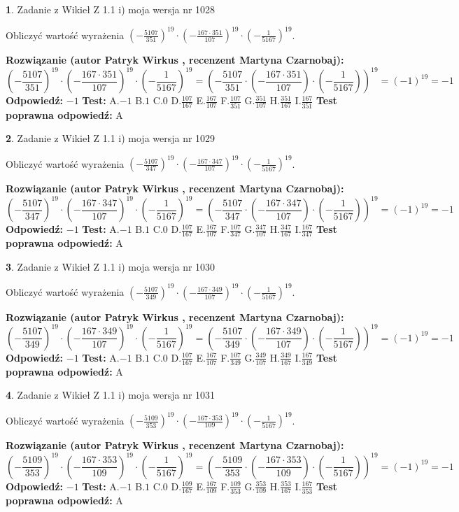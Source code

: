 \documentclass[12pt, a4paper]{article}
\theoremstyle{definition} %
\newtheorem{zad}{}
\newcommand{\zadStart}[1]{\begin{zad}#1\newline}
\newcommand{\zadStop}{\end{zad}}
\newcommand{\rozwStart}[2]{\noindent \textbf{Rozwiązanie (autor #1 , recenzent #2): }\newline}
\newcommand{\rozwStop}{\newline}
\newcommand{\odpStart}{\noindent \textbf{Odpowiedź:}\newline}
\newcommand{\odpStop}{\newline}
\newcommand{\testStart}{\noindent \textbf{Test:}\newline}
\newcommand{\testStop}{\newline}
\newcommand{\kluczStart}{\noindent \textbf{Test poprawna odpowiedź:}\newline}
\newcommand{\kluczStop}{\newline}
\begin{document}
\zadStart{Zadanie z Wikieł Z 1.1 i) moja wersja nr 1028}

Obliczyć wartość wyrażenia $(-\frac{5107}{351})^{19} \cdot (-\frac{167 \cdot 351}{107})^{19} \cdot (-\frac{1}{5167})^{19}$.
\zadStop
\rozwStart{Patryk Wirkus}{Martyna Czarnobaj}
$$(-\frac{5107}{351})^{19} \cdot (-\frac{167 \cdot 351}{107})^{19} \cdot (-\frac{1}{5167})^{19} = (-\frac{5107}{351} \cdot (-\frac{167 \cdot 351}{107}) \cdot (-\frac{1}{5167}))^{19} = (-1)^{19} = -1$$
\rozwStop
\odpStart
$-1$
\odpStop
\testStart
A.$-1$ B.$1$ C.$0$ D.$\frac{107}{167}$ E.$\frac{167}{107}$
F.$\frac{107}{351}$ G.$\frac{351}{107}$
H.$\frac{351}{167}$
I.$\frac{167}{351}$
\testStop
\kluczStart
A
\kluczStop



\zadStart{Zadanie z Wikieł Z 1.1 i) moja wersja nr 1029}

Obliczyć wartość wyrażenia $(-\frac{5107}{347})^{19} \cdot (-\frac{167 \cdot 347}{107})^{19} \cdot (-\frac{1}{5167})^{19}$.
\zadStop
\rozwStart{Patryk Wirkus}{Martyna Czarnobaj}
$$(-\frac{5107}{347})^{19} \cdot (-\frac{167 \cdot 347}{107})^{19} \cdot (-\frac{1}{5167})^{19} = (-\frac{5107}{347} \cdot (-\frac{167 \cdot 347}{107}) \cdot (-\frac{1}{5167}))^{19} = (-1)^{19} = -1$$
\rozwStop
\odpStart
$-1$
\odpStop
\testStart
A.$-1$ B.$1$ C.$0$ D.$\frac{107}{167}$ E.$\frac{167}{107}$
F.$\frac{107}{347}$ G.$\frac{347}{107}$
H.$\frac{347}{167}$
I.$\frac{167}{347}$
\testStop
\kluczStart
A
\kluczStop



\zadStart{Zadanie z Wikieł Z 1.1 i) moja wersja nr 1030}

Obliczyć wartość wyrażenia $(-\frac{5107}{349})^{19} \cdot (-\frac{167 \cdot 349}{107})^{19} \cdot (-\frac{1}{5167})^{19}$.
\zadStop
\rozwStart{Patryk Wirkus}{Martyna Czarnobaj}
$$(-\frac{5107}{349})^{19} \cdot (-\frac{167 \cdot 349}{107})^{19} \cdot (-\frac{1}{5167})^{19} = (-\frac{5107}{349} \cdot (-\frac{167 \cdot 349}{107}) \cdot (-\frac{1}{5167}))^{19} = (-1)^{19} = -1$$
\rozwStop
\odpStart
$-1$
\odpStop
\testStart
A.$-1$ B.$1$ C.$0$ D.$\frac{107}{167}$ E.$\frac{167}{107}$
F.$\frac{107}{349}$ G.$\frac{349}{107}$
H.$\frac{349}{167}$
I.$\frac{167}{349}$
\testStop
\kluczStart
A
\kluczStop



\zadStart{Zadanie z Wikieł Z 1.1 i) moja wersja nr 1031}

Obliczyć wartość wyrażenia $(-\frac{5109}{353})^{19} \cdot (-\frac{167 \cdot 353}{109})^{19} \cdot (-\frac{1}{5167})^{19}$.
\zadStop
\rozwStart{Patryk Wirkus}{Martyna Czarnobaj}
$$(-\frac{5109}{353})^{19} \cdot (-\frac{167 \cdot 353}{109})^{19} \cdot (-\frac{1}{5167})^{19} = (-\frac{5109}{353} \cdot (-\frac{167 \cdot 353}{109}) \cdot (-\frac{1}{5167}))^{19} = (-1)^{19} = -1$$
\rozwStop
\odpStart
$-1$
\odpStop
\testStart
A.$-1$ B.$1$ C.$0$ D.$\frac{109}{167}$ E.$\frac{167}{109}$
F.$\frac{109}{353}$ G.$\frac{353}{109}$
H.$\frac{353}{167}$
I.$\frac{167}{353}$
\testStop
\kluczStart
A
\kluczStop
\end{document}
